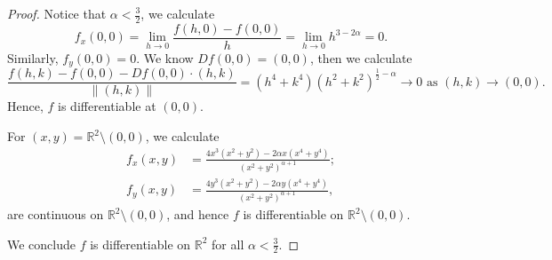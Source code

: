 \begin{Exercise}
\begin{proof}
Notice that $\alpha<\frac{3}{2}$, we calculate
$$
f_x(0,0) 
= \lim_{h\to 0} \frac{f(h,0)-f(0,0)}{h} 
= \lim_{h\to 0} h^{3-2\alpha}
= 0.
$$
Similarly, $f_y(0,0) = 0$. We know $D f(0,0) = (0,0)$, then we calculate
$$
\frac{f(h,k)-f(0,0)-D f(0,0)\cdot(h,k)}{\| (h,k) \|}
= \left( h^4+k^4 \right) \left(h^2+k^2 \right)^{\frac{1}{2}-\alpha} \to 0 \text{ as } (h,k)\to(0,0).
$$
Hence, $f$ is differentiable at $(0,0)$.

For $(x,y) = \mathbb{R}^2 \setminus (0,0)$, we calculate
\begin{align*}
f_x(x,y) &= \frac{4x^3(x^2+y^2)-2\alpha x(x^4+y^4)}{(x^2+y^2)^{\alpha+1}}; \\
f_y(x,y) &= \frac{4y^3(x^2+y^2)-2\alpha y(x^4+y^4)}{(x^2+y^2)^{\alpha+1}},
\end{align*}
are continuous on $\mathbb{R}^2 \setminus (0,0)$, and hence $f$ is differentiable on $\mathbb{R}^2 \setminus (0,0)$.

We conclude $f$ is differentiable on $\mathbb{R}^2$ for all $\alpha<\frac{3}{2}$.
\end{proof}
\end{Exercise}